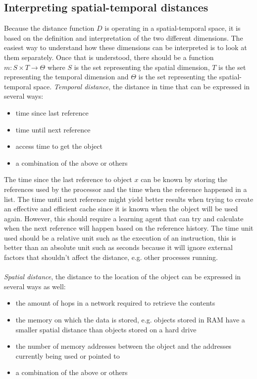\documentclass[pdftex,a4paper,12pt,twoside]{report}
\begin{document}
\subsection{Interpreting spatial-temporal distances}
Because the distance function $D$ is operating in a spatial-temporal space, it is based on the definition and interpretation of the two different dimensions.
The easiest way to understand how these dimensions can be interpreted is to look at them separately. Once that is understood, there should be a function
$m : S \times T \to \Theta$ where $S$ is the set representing the spatial dimension, $T$ is the set representing the temporal dimension and $\Theta$ is the set representing the spatial-temporal space.
\newpage
\emph{Temporal distance}, the distance in time that can be expressed in several ways:
\begin{itemize}
\item time since last reference
\item time until next reference
\item access time to get the object
\item a combination of the above or others
\end{itemize}
The time since the last reference to object $x$ can be known by storing the references used by the processor and the time when the reference happened in a list. The time until next reference might yield better results when trying to create an effective and efficient cache since it is known when the object will be used again. However, this should require a learning agent that can try and calculate when the next reference will happen based on the reference history. The time unit used should be a relative unit such as the execution of an instruction, this is better than an absolute unit such as seconds because it will ignore external factors that shouldn't affect the distance, e.g. other processes running.
\\\\
\emph{Spatial distance}, the distance to the location of the object can be expressed in several ways as well:
\begin{itemize}
\item the amount of hops in a network required to retrieve the contents
\item the memory on which the data is stored, e.g. objects stored in RAM have a smaller spatial distance than objects stored on a hard drive
\item the number of memory addresses between the object and the addresses currently being used or pointed to
\item a combination of the above or others
\end{itemize}
\end{document}
